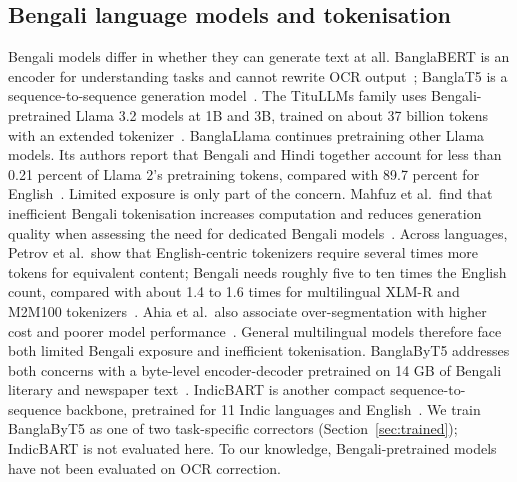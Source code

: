 \documentclass[conference]{IEEEtran}
\begin{document}
\subsection{Bengali language models and tokenisation}
Bengali models differ in whether they can generate text at all. BanglaBERT is an encoder for understanding tasks and cannot rewrite OCR output~\cite{bhattacharjee2022banglabert}; BanglaT5 is a sequence-to-sequence generation model~\cite{bhattacharjee2023banglat5}. The TituLLMs family uses Bengali-pretrained Llama 3.2 models at 1B and 3B, trained on about 37 billion tokens with an extended tokenizer~\cite{nahin2025titullms}. BanglaLlama continues pretraining other Llama models. Its authors report that Bengali and Hindi together account for less than 0.21 percent of Llama 2's pretraining tokens, compared with 89.7 percent for English~\cite{zehady2026banglallama}. Limited exposure is only part of the concern. Mahfuz et al.\ find that inefficient Bengali tokenisation increases computation and reduces generation quality when assessing the need for dedicated Bengali models~\cite{mahfuz2025toolate}. Across languages, Petrov et al.\ show that English-centric tokenizers require several times more tokens for equivalent content; Bengali needs roughly five to ten times the English count, compared with about 1.4 to 1.6 times for multilingual XLM-R and M2M100 tokenizers~\cite{petrov2023tokenizer}. Ahia et al.\ also associate over-segmentation with higher cost and poorer model performance~\cite{ahia2023cost}. General multilingual models therefore face both limited Bengali exposure and inefficient tokenisation. BanglaByT5 addresses both concerns with a byte-level encoder-decoder pretrained on 14 GB of Bengali literary and newspaper text~\cite{bhattacharyya2025banglabyt5}. IndicBART is another compact sequence-to-sequence backbone, pretrained for 11 Indic languages and English~\cite{dabre2022indicbart}. We train BanglaByT5 as one of two task-specific correctors (Section~\ref{sec:trained}); IndicBART is not evaluated here. To our knowledge, Bengali-pretrained models have not been evaluated on OCR correction.
\end{document}
